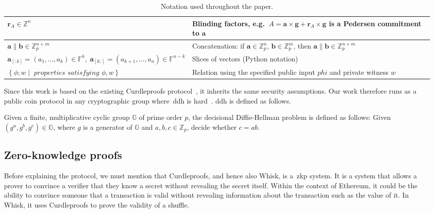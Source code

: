 \begin{table*}[!htb]
\begin{tabular}{|l|l|}
        \hline
        $\mathbf{r}_A\in\mathbb{Z}^n$ & Blinding factors, e.g.\ $A=\mathbf{a}\times\mathbf{g} + \mathbf{r}_A \times \mathbf{g}$ is a Pedersen commitment to $\mathbf{a}$ \\
        \hline
        $\mathbf{a}\parallel \mathbf{b}\in\mathbb{Z}_p^{n+m}$
        & Concatenation: if $\mathbf{a}\in\mathbb{Z}_p^n$, $\mathbf{b}\in\mathbb{Z}_p^m$, then $\mathbf{a}\parallel \mathbf{b}\in\mathbb{Z}_p^{n+m}$ \\
        \hline
        $\mathbf{a}_{[:k]}=(a_1,\dots,a_k)\in\mathbb{F}^k, \; \mathbf{a}_{[k:]}=(a_{k+1},\dots,a_n)\in\mathbb{F}^{n-k}$
        & Slices of vectors (Python notation) \\
        \hline
        $\left\{\phi; w\middle|\textit{ properties satisfying }\phi,w\right\}$
        & Relation using the specified public input $phi$ and private witness $w$ \\
        \hline
    \end{tabular}
    \caption{Notation used throughout the paper.}
    \label{tab:notation}
\end{table*}


Since this work is based on the existing Curdleproofs protocol~\cite{Curdleproofs}, it inherits the same security assumptions.
Our work therefore runs as a public coin protocol in any cryptographic group where~\gls{ddh} is hard~\cite{10.1007/BFb0054851}.
\gls{ddh} is defined as follows.

\begin{definition}[DDH]
 Given a finite, multiplicative cyclic group $\mathbb{G}$ of prime order $p$, the decisional Diffie-Hellman problem is defined as follows: Given $(g^a,g^b,g^c)\in\mathbb{G}$, where $g$ is a generator of $\mathbb{G}$ and $a,b,c\in\mathbb{Z}_p$, decide whether $c=ab$.
\end{definition}

\subsection{Zero-knowledge proofs}\label{sec:background-zkps}
Before explaining the protocol, we must mention that Curdleproofs, and hence also Whisk, is a~\gls{zkp} system.
It is a system that allows a prover to convince a verifier that they know a secret without revealing the secret itself.
Within the context of Ethereum, it could be the ability to convince someone that a transaction is valid without revealing information about the transaction such as the value of it.
In Whisk, it uses Curdleproofs to prove the validity of a shuffle.

